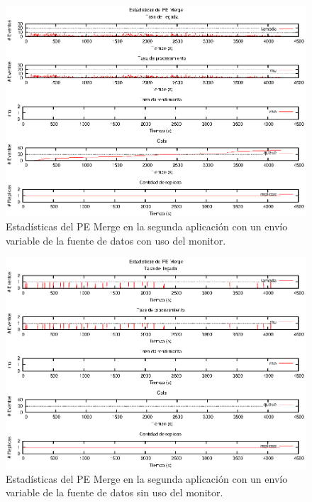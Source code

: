 \begin{figure}[p]
\centering
    \includegraphics[scale=1.1]{images/exp/app2/normal/cm/statusMergePE.eps}
    \caption{Estadísticas del PE Merge en la segunda aplicación con un envío variable de la fuente de datos con uso del monitor.}
    \label{fig:app2-normal-statusMergePE-cm}
\end{figure}

\begin{figure}[p]
\centering
    \includegraphics[scale=1.1]{images/exp/app2/normal/sm/statusMergePE.eps}
    \caption{Estadísticas del PE Merge en la segunda aplicación con un envío variable de la fuente de datos sin uso del monitor.}
    \label{fig:app2-normal-statusMergePE-sm}
\end{figure}

